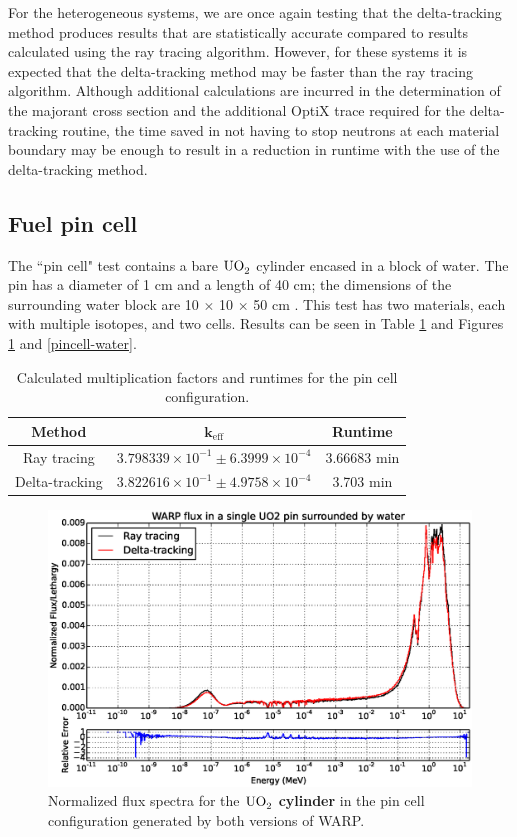 For the heterogeneous systems, we are once again testing that the delta-tracking method produces results
that are statistically accurate compared to results calculated using the ray tracing algorithm. However,
for these systems it is expected that the delta-tracking method may be faster than the ray tracing
algorithm. Although additional calculations are incurred in the determination of the majorant cross
section and the additional OptiX trace required for the delta-tracking routine, the time saved in not 
having to stop neutrons at each material boundary may be enough to result in a reduction in runtime with 
the use of the delta-tracking method.

\subsection{Fuel pin cell}

The ``pin cell" test contains a bare $\ce{UO_2}$ cylinder encased in a block of water. The pin has a 
diameter of 1 cm and a length of 40 cm; the dimensions of the surrounding water block are 10 $\times$ 10
$\times$ 50 cm \cite{warp2015}. This test has two materials, each with multiple isotopes, and two cells.
Results can be seen in Table \ref{pin_table} and Figures \ref{pincell-fuel} and \ref{pincell-water}.

\begin{table}[h!]
\centering
\caption{Calculated multiplication factors and runtimes for the pin cell configuration.}
\label{pin_table}
\begin{tabular}{| c | c | c |}
\hline
\textbf{Method} & $\mathbf{k_{\mathrm{eff}}}$ & \textbf{Runtime} \\
\hline
Ray tracing & $3.798339 \times 10^{-1} \pm 6.3999 \times 10^{-4}$ & 3.66683 min \\
Delta-tracking & $3.822616 \times 10^{-1} \pm 4.9758 \times 10^{-4}$ & 3.703 min \\
\hline
\end{tabular}
\end{table}

\begin{figure}[h!]
\includegraphics[width=\textwidth]{img/pincell-fuel.eps}
\caption{Normalized flux spectra for the \textbf{$\ce{UO_2}$ cylinder} in the pin cell 
configuration generated by both versions of WARP. \label{pincell-fuel}}
\end{figure}

